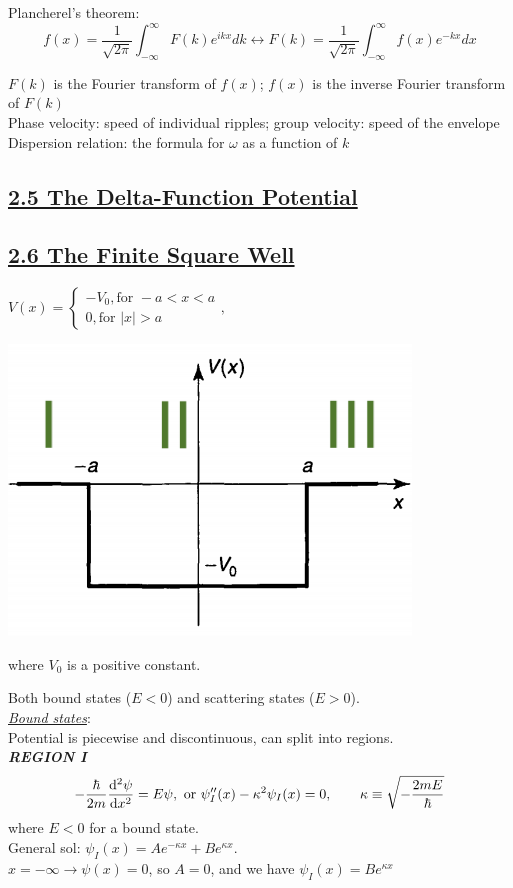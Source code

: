 Plancherel's theorem: $$f(x) = \frac{1}{\sqrt{2 \pi}} \int_{-\infty}^{\infty} F(k) e^{ikx} dk \leftrightarrow F(k) = \frac{1}{\sqrt{2\pi}} \int_{-\infty}^{\infty} f(x) e^{-kx} dx$$

$F(k)$ is the Fourier transform of $f(x)$; $f(x)$ is the inverse Fourier transform of $F(k)$ \\

Phase velocity: speed of individual ripples; group velocity: speed of the envelope \\

Dispersion relation: the formula for $\omega$ as a function of $k$

\subsection{\underline{2.5 The Delta-Function Potential}}

\subsection{\underline{2.6 The Finite Square Well}}
$V(x) = \begin{cases} -V_{0}, \textrm{for } -a < x < a \\ 0, \textrm{for } |x| > a \end{cases},$ 

\vspace{-5em}
\begin{Figure}
    \raggedleft
    \includegraphics[width=0.3\columnwidth]{figures/finite_square_well.png}
\end{Figure}
\vspace{-2em}

where $V_0$ is a positive constant.

Both bound states ($E < 0$) and scattering states ($E > 0$). \\

\textit{\underline{Bound states}}: \\
Potential is piecewise and discontinuous, can split into regions. \\

\textbf{\textit{REGION I}}
$$-\frac{\hbar}{2m} \dv[2]{\psi}{x} = E \psi, \textrm{ or } \psi''_{I}(x) - \kappa^2 \psi_{I}(x) = 0, \qquad \kappa \equiv \sqrt{-\frac{2mE}{\hbar}}$$
where $E < 0$ for a bound state. \\
General sol: $\psi_{I}(x) = Ae^{-\kappa x} + B e^{\kappa x}$. \\
$x = -\infty \rightarrow \psi(x) = 0$, so $A = 0$, and we have $\psi_{I}(x) = Be^{\kappa x}$

